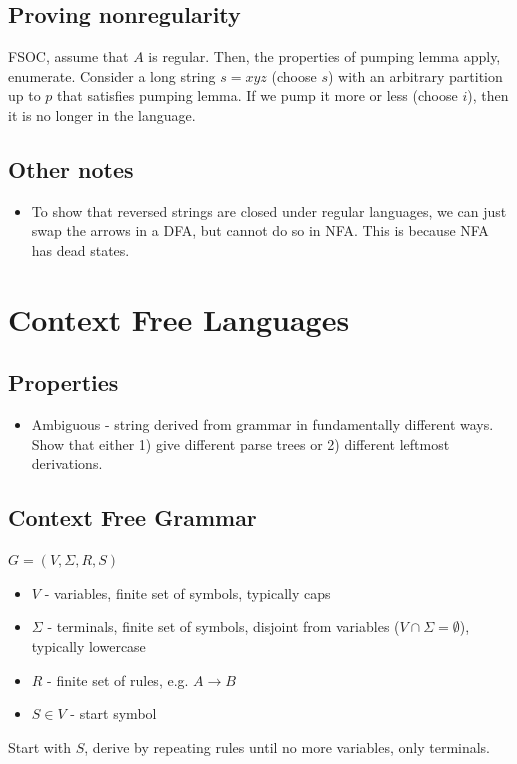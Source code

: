 \documentclass{article}
\begin{document}
\subsection{Proving nonregularity}
FSOC, assume that $A$ is regular. Then, the properties of pumping lemma apply, enumerate. Consider a long string $s=xyz$ (choose $s$) with an arbitrary partition up to $p$ that satisfies pumping lemma. If we pump it more or less (choose $i$), then it is no longer in the language.

\subsection{Other notes}
\begin{itemize}
    \item To show that reversed strings are closed under regular languages, we can just swap the arrows in a DFA, but cannot do so in NFA. This is because NFA has dead states.
\end{itemize}


\section{Context Free Languages}
\subsection{Properties}
\begin{itemize}
    \item Ambiguous - string derived from grammar in fundamentally different ways. Show that either 1) give different parse trees or 2) different leftmost derivations.
\end{itemize}

\subsection{Context Free Grammar}
$G = (V, \Sigma, R, S)$
\begin{itemize}
    \item $V$ - variables, finite set of symbols, typically caps
    \item $\Sigma$ - terminals, finite set of symbols, disjoint from variables ($V \cap \Sigma = \emptyset$), typically lowercase
    \item $R$ - finite set of rules, e.g. $A \to B$
    \item $S \in V$ - start symbol
\end{itemize}
Start with $S$, derive by repeating rules until no more variables, only terminals.
\end{document}
